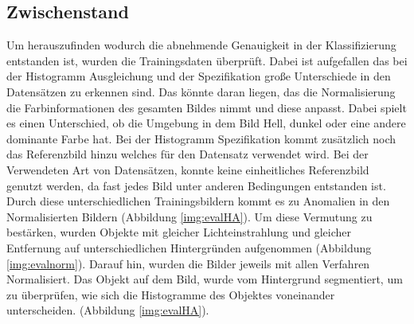 \documentclass[a4paper,12pt,oneside]{article}
\begin{document}
\subsection{Zwischenstand}
Um herauszufinden wodurch die abnehmende Genauigkeit in der Klassifizierung entstanden ist, wurden die Trainingsdaten überprüft. Dabei ist aufgefallen das bei der Histogramm Ausgleichung und der Spezifikation große Unterschiede in den Datensätzen zu erkennen sind. Das könnte daran liegen, das die Normalisierung die Farbinformationen des gesamten Bildes nimmt und diese anpasst. Dabei spielt es einen Unterschied, ob die Umgebung in dem Bild Hell, dunkel oder eine andere dominante Farbe hat. Bei der Histogramm Spezifikation kommt zusätzlich noch das Referenzbild hinzu welches für den Datensatz verwendet wird. Bei der Verwendeten Art von Datensätzen, konnte keine einheitliches Referenzbild genutzt werden, da fast jedes Bild unter anderen Bedingungen entstanden ist. Durch diese unterschiedlichen Trainingsbildern kommt es zu Anomalien in den Normalisierten Bildern (Abbildung \ref{img:evalHA}). Um diese Vermutung zu bestärken, wurden Objekte mit gleicher Lichteinstrahlung und gleicher Entfernung auf unterschiedlichen Hintergründen aufgenommen (Abbildung \ref{img:evalnorm}). Darauf hin, wurden die Bilder jeweils mit allen Verfahren Normalisiert. Das Objekt auf dem Bild, wurde vom Hintergrund segmentiert, um zu überprüfen, wie sich die Histogramme des Objektes voneinander unterscheiden. (Abbildung \ref{img:evalHA}).\\
\end{document}
